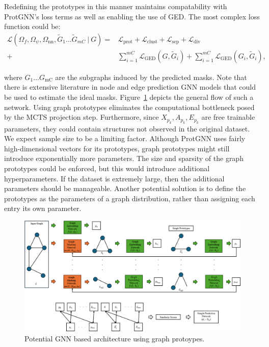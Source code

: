 \documentclass[
  11pt,
  letterpaper,
]{article}
\begin{document}
Redefining the prototypes in this manner maintains compatability with
ProtGNN's loss terms as well as enabling the use of GED. The most
complex loss function could be:\\
\begin{equation}
    \begin{split}
        \mathcal{L}(\Omega_f, \Omega_\psi, \Omega_\text{nn}, \tilde{G}_1 \dots \tilde{G}_{mC} \ | \ G) = &\mathcal{L}_\text{prot} + \mathcal{L}_\text{clust} + \mathcal{L}_\text{sep} + \mathcal{L}_\text{div} \\ + &\sum_{i = 1}^{mC} \mathcal{L}_\text{GED}(G, \tilde{G}_i) + \sum_{i = 1}^{mC} \mathcal{L}_\text{GED}(G_i, \tilde{G}_i), 
    \end{split}
\end{equation}

where \(G_1 \dots G_\text{mC}\) are the subgraphs induced by the
predicted masks. Note that there is extensive literature in node and
edge prediction GNN models that could be used to estimate the ideal
masks. Figure~\ref{fig-graph-prot_diag} depicts the general flow of such
a network. Using graph prototypes eliminates the computational
bottleneck posed by the MCTS projection step. Furthermore, since
\(X_{p_k}, A_{p_k}, E_{p_k}\) are free trainable parameters, they could
contain structures not observed in the original dataset. We expect
sample size to be a limiting factor. Although ProtGNN uses fairly
high-dimensional vectors for its prototypes, graph prototypes might
still introduce exponentially more parameters. The size and sparsity of
the graph prototypes could be enforced, but this would introduce
additional hyperparameters. If the dataset is extremely large, then the
additional parameters should be manageable. Another potential solution
is to define the prototypes as the parameters of a graph distribution,
rather than assigning each entry its own parameter.

\begin{figure}

{\centering \includegraphics{figures/Graph_prot_diagram.png}

}

\caption{\label{fig-graph-prot_diag}Potential GNN based architecture
using graph protoypes.}

\end{figure}
\end{document}
